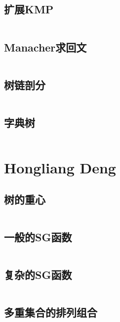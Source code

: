 \documentclass[a4paper,11pt]{article}
\begin{document}
\subsection{扩展KMP}
\inputminted[breaklines]{c++}{Li/扩展KMP.cpp}
\subsection{Manacher求回文}
\inputminted[breaklines]{c++}{Li/Manacher求回文.cpp}
\subsection{树链剖分}
\inputminted[breaklines]{c++}{Li/树链剖分.cpp}
\subsection{字典树}
\inputminted[breaklines]{c++}{Li/字典树.cpp}

\newpage

\section{Hongliang Deng}
\subsection{树的重心}
\inputminted[breaklines]{c++}{Deng/树的重心.cpp}
\subsection{一般的SG函数}
\inputminted[breaklines]{c++}{Deng/一般的SG函数.cpp}
\subsection{复杂的SG函数}
\inputminted[breaklines]{c++}{Deng/复杂的SG函数.cpp}
\subsection{多重集合的排列组合}
\inputminted[breaklines]{c++}{Deng/多重集合的排列组合.cpp}
\end{document}
